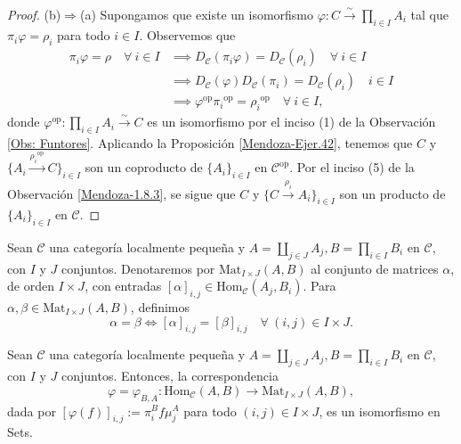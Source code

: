 \documentclass[tesis]{subfiles}
\begin{document}
\begin{proof}
    (b)$\Rightarrow$(a) Supongamos que existe un isomorfismo $\varphi:C\xrightarrow[]{\sim}\prod_{i\in I}A_i$ tal que $\pi_i\varphi=\rho_i$ para todo $i\in I$. Observemos que
    \begin{align*}
        \pi_i\varphi=\rho \quad \forall \ i\in I &\implies D_\mathscr{C}(\pi_i\varphi) = D_\mathscr{C}(\rho_i) \quad \forall \ i\in I \\
                                                 &\implies D_\mathscr{C}(\varphi)D_\mathscr{C}(\pi_i) = D_\mathscr{C}(\rho_i) \quad i\in I \\
                                                 &\implies \varphi^\text{op}\pi_i{}^\text{op} = \rho_i{}^\text{op} \quad \forall \ i\in I,
    \end{align*}
    donde $\varphi^\text{op}:\prod_{i\in I}A_i\xrightarrow[]{\sim}C$ es un isomorfismo por el inciso (1) de la Observación \ref{Obs: Funtores}. Aplicando la Proposición \ref{Mendoza-Ejer.42}, tenemos que $C$ y $\{A_i\xrightarrow[]{\rho_i{}^\text{op}} C\}_{i\in I}$ son un coproducto de $\{A_i\}_{i\in I}$ en $\mathscr{C}^\text{op}$. Por el inciso (5) de la Observación \ref{Mendoza-1.8.3}, se sigue que $C$ y $\{C\xrightarrow[]{\rho_i} A_i\}_{i\in I}$ son un producto de $\{A_i\}_{i\in I}$ en $\mathscr{C}$.
\end{proof}


\begin{Def}\label{Def: Mat}
    Sean $\mathscr{C}$ una categoría localmente pequeña y $A=\coprod_{j\in J}A_j, B=\prod_{i\in I}B_i$ en $\mathscr{C}$, con $I$ y $J$ conjuntos. Denotaremos por $\text{Mat}_{I\times J}(A,B)$ al conjunto de matrices $\alpha$, de orden $I\times J$, con entradas $[\alpha]_{i,j}\in\text{Hom}_\mathscr{C}(A_j,B_i)$. Para $\alpha,\beta\in\text{Mat}_{I\times J}(A,B)$, definimos
    \[
        \alpha = \beta \iff [\alpha]_{i,j} = [\beta]_{i,j} \quad \forall \ (i,j)\in I\times J.
    \] 
\end{Def}

\begin{Prop}\label{Mendoza-1.8.11}
    Sean $\mathscr{C}$ una categoría localmente pequeña y $A=\coprod_{j\in J}A_j, B=\prod_{i\in I}B_i$ en $\mathscr{C}$, con $I$ y $J$ conjuntos. Entonces, la correspondencia
    \[
        \varphi = \varphi_{B,A}:\text{Hom}_\mathscr{C}(A,B) \to \text{Mat}_{I\times J}(A,B),
    \]
    dada por $[\varphi(f)]_{i,j} := \pi_i^Bf\mu_j^A$ para todo $(i,j)\in I\times J$, es un isomorfismo en Sets.
\end{Prop}
\end{document}

